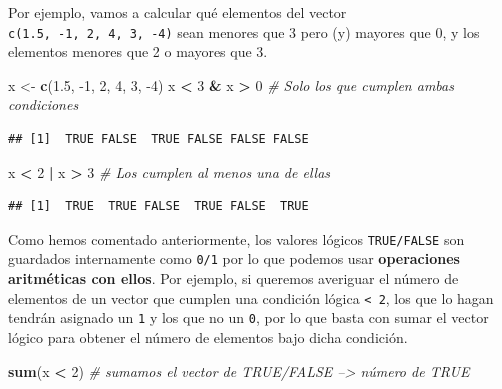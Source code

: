 \documentclass[11pt,]{book}
\newenvironment{Shaded}{\begin{snugshade}}{\end{snugshade}}
\newcommand{\CommentTok}[1]{\textcolor[rgb]{0.37,0.37,0.37}{\textit{#1}}}
\newcommand{\DecValTok}[1]{\textcolor[rgb]{0.06,0.06,0.06}{#1}}
\newcommand{\FloatTok}[1]{\textcolor[rgb]{0.06,0.06,0.06}{#1}}
\newcommand{\KeywordTok}[1]{\textcolor[rgb]{0.27,0.27,0.27}{\textbf{#1}}}
\newcommand{\NormalTok}[1]{#1}
\newcommand{\OperatorTok}[1]{\textcolor[rgb]{0.43,0.43,0.43}{\textbf{#1}}}
\newcommand{\StringTok}[1]{\textcolor[rgb]{0.5,0.5,0.5}{#1}}
\begin{document}
Por ejemplo, vamos a calcular qué elementos del vector \texttt{c(1.5,\ -1,\ 2,\ 4,\ 3,\ -4)} sean menores que 3 pero (y) mayores que 0, y los elementos menores que 2 o mayores que 3.

\begin{Shaded}
\begin{Highlighting}[]
\NormalTok{x <-}\StringTok{ }\KeywordTok{c}\NormalTok{(}\FloatTok{1.5}\NormalTok{, }\DecValTok{-1}\NormalTok{, }\DecValTok{2}\NormalTok{, }\DecValTok{4}\NormalTok{, }\DecValTok{3}\NormalTok{, }\DecValTok{-4}\NormalTok{)}
\NormalTok{x }\OperatorTok{<}\StringTok{ }\DecValTok{3} \OperatorTok{&}\StringTok{ }\NormalTok{x }\OperatorTok{>}\StringTok{ }\DecValTok{0} \CommentTok{# Solo los que cumplen ambas condiciones}
\end{Highlighting}
\end{Shaded}

\begin{verbatim}
## [1]  TRUE FALSE  TRUE FALSE FALSE FALSE
\end{verbatim}

\begin{Shaded}
\begin{Highlighting}[]
\NormalTok{x }\OperatorTok{<}\StringTok{ }\DecValTok{2} \OperatorTok{|}\StringTok{ }\NormalTok{x }\OperatorTok{>}\StringTok{ }\DecValTok{3} \CommentTok{# Los cumplen al menos una de ellas}
\end{Highlighting}
\end{Shaded}

\begin{verbatim}
## [1]  TRUE  TRUE FALSE  TRUE FALSE  TRUE
\end{verbatim}

Como hemos comentado anteriormente, los valores lógicos \texttt{TRUE/FALSE} son guardados internamente como \texttt{0/1} por lo que podemos usar \textbf{operaciones aritméticas con ellos}. Por ejemplo, si queremos averiguar el número de elementos de un vector que cumplen una condición lógica \texttt{\textless{}\ 2}, los que lo hagan tendrán asignado un \texttt{1} y los que no un \texttt{0}, por lo que basta con sumar el vector lógico para obtener el número de elementos bajo dicha condición.

\begin{Shaded}
\begin{Highlighting}[]
\KeywordTok{sum}\NormalTok{(x }\OperatorTok{<}\StringTok{ }\DecValTok{2}\NormalTok{) }\CommentTok{# sumamos el vector de TRUE/FALSE --> número de TRUE}
\end{Highlighting}
\end{Shaded}
\end{document}
